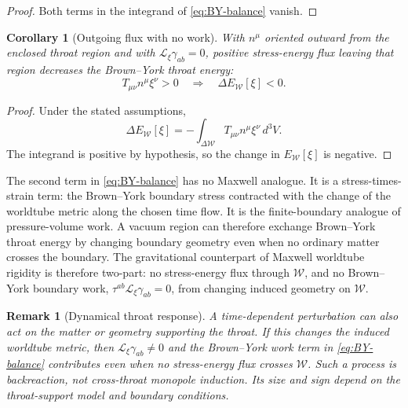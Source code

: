 \documentclass[aps,prd,10pt,onecolumn,nofootinbib,superscriptaddress,floatfix]{revtex4-2}
\newtheorem{corollary}{Corollary}
\newtheorem{remark}{Remark}
\begin{document}
\begin{proof}
Both terms in the integrand of \eqref{eq:BY-balance} vanish.
\end{proof}

\begin{corollary}[Outgoing flux with no work]
\label{cor:outgoing-flux}
With $n^\mu$ oriented outward from the enclosed throat region and with
$\mathcal L_\xi\gamma_{ab}=0$, positive stress-energy flux leaving that region
decreases the Brown--York throat energy:
\begin{equation}
  T_{\mu\nu}n^\mu\xi^\nu>0
  \quad\Longrightarrow\quad
  \Delta E_{\mathcal W}[\xi]<0 .
\end{equation}
\end{corollary}

\begin{proof}
Under the stated assumptions,
\begin{equation}
  \Delta E_{\mathcal W}[\xi]
  =
  -\int_{\Delta\mathcal W}T_{\mu\nu}n^\mu\xi^\nu\,d^3V .
\end{equation}
The integrand is positive by hypothesis, so the change in
$E_{\mathcal W}[\xi]$ is negative.
\end{proof}

The second term in \eqref{eq:BY-balance} has no Maxwell analogue.  It is a
stress-times-strain term: the Brown--York boundary
stress contracted with the change of the worldtube metric along the chosen time
flow.  It is the finite-boundary analogue of pressure-volume work.  A vacuum
region can therefore exchange Brown--York throat energy by changing boundary
geometry even when no ordinary matter crosses the boundary.  The gravitational
counterpart of Maxwell worldtube rigidity is therefore two-part: no
stress-energy flux through $\mathcal W$, and no Brown--York boundary work,
$\tau^{ab}\mathcal L_\xi\gamma_{ab}=0$, from changing induced geometry on
$\mathcal W$.

\begin{remark}[Dynamical throat response]
\label{rem:dynamical-throat-response}
A time-dependent perturbation can also act on the matter or geometry supporting
the throat.  If this changes the induced worldtube metric, then
$\mathcal L_\xi\gamma_{ab}\ne0$ and the Brown--York work term in
\eqref{eq:BY-balance} contributes even when no stress-energy flux crosses
$\mathcal W$.  Such a process is backreaction, not cross-throat monopole
induction.  Its size and sign depend on the
throat-support model and boundary conditions.
\end{remark}
\end{document}
